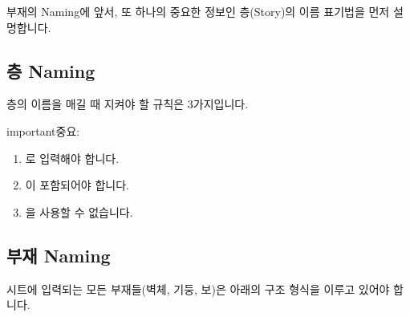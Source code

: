 \documentclass[a4paper,11pt,korean,openany,oneside]{sphinxmanual}
\begin{document}
\sphinxAtStartPar
부재의 Naming에 앞서, 또 하나의 중요한 정보인 층(Story)의 이름 표기법을 먼저 설명합니다.


\subsection{층 Naming}
\label{\detokenize{2_naming_rules:naming}}
\sphinxAtStartPar
층의 이름을 매길 때 지켜야 할 규칙은 3가지입니다.

\begin{sphinxadmonition}{important}{중요:}\begin{enumerate}
%
\item {} 
\sphinxAtStartPar
{}로 입력해야 합니다.

\item {} 
\sphinxAtStartPar
{}이 포함되어야 합니다.

\item {} 
\sphinxAtStartPar
{}을 사용할 수 없습니다.

\end{enumerate}
\end{sphinxadmonition}

\begin{figure}[htbp]
\centering
\capstart

\noindent{}
\caption{}\label{\detokenize{2_naming_rules:id3}}\end{figure}


\subsection{부재 Naming}
\label{\detokenize{2_naming_rules:id2}}
\sphinxAtStartPar
시트에 입력되는 모든 부재들(벽체, 기둥, 보)은 아래의 구조 형식을 이루고 있어야 합니다.
\end{document}
